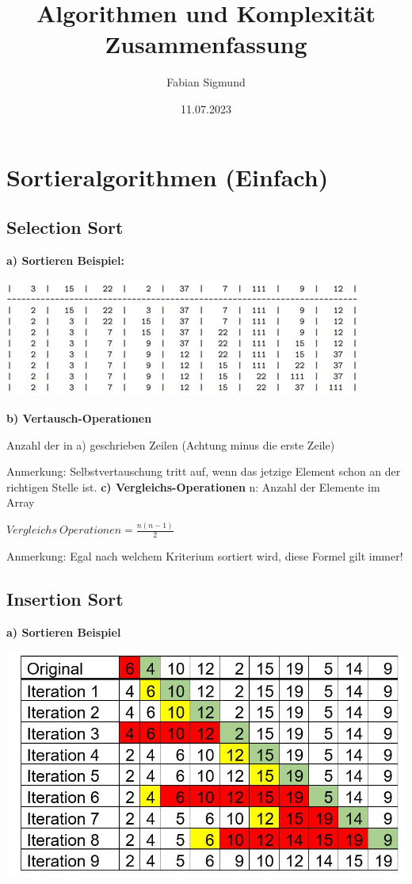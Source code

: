 \documentclass[12pt]{article}
\title{Algorithmen und Komplexität Zusammenfassung}
\author{Fabian Sigmund}
\date{11.07.2023}
\begin{document}
	\maketitle
	\pagebreak
	\section{Sortieralgorithmen (Einfach)}
	\subsection{Selection Sort}
	
	\textbf{a) Sortieren Beispiel:}
	
	\includegraphics{SelectionSort}
	\break
	
	\textbf{b) Vertausch-Operationen} \hfill \break
	
	Anzahl der in a) geschrieben Zeilen (Achtung minus die erste Zeile)
	
	Anmerkung: Selbstvertauschung tritt auf, wenn das jetzige Element schon an der richtigen Stelle ist.
	\newline
	\newline
	\textbf{c) Vergleichs-Operationen}
	\newline
	\newline
	n: Anzahl der Elemente im Array
	
	\begin{center}
		$Vergleichs \ Operationen = $\Large{$\frac{n(n-1)}{2}$}
	\end{center}
	
	Anmerkung: Egal nach welchem Kriterium sortiert wird, diese Formel gilt immer!
	
	\pagebreak
	
	
	\subsection{Insertion Sort}
	\textbf{a) Sortieren Beispiel}
	
	\includegraphics[scale=0.5]{InsertionSort}
	
\end{document}
